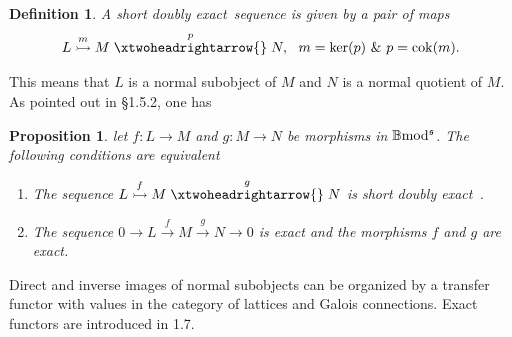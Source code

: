 \documentclass[12pt]{article}
\newtheorem{prop}[thm]{Proposition}
\newtheorem{defn}[thm]{Definition}
\def\sker{{\rm ker}}
\def\scoker{{\rm cok}}
\def\B{{\mathbb B}}
\def\exxx{{doubly exact}~}
\def\b2{{\rm \B mod^{\mathfrak s}}}
\begin{document}
 \begin{defn}\label{defn shortexact}
 	 A short \exxx sequence is given by a pair of maps $$L\stackrel{m}{\rightarrowtail}M\stackrel{p}{\xtwoheadrightarrow{}}N,~~ m= \sker(p)\ \& \  p= \scoker(m).$$
 \end{defn} 
  This means that 
  $L$ is a normal subobject of $M$ and $N$ is a normal quotient of $M$. As pointed out in \cite{gra1} \S 1.5.2, one has
  \begin{prop}\label{shortex} let $f:L\to M$ and $g:M\to N$ be morphisms in $\b2$. The following conditions are equivalent 
 \begin{enumerate}
  \item The sequence
  $L\stackrel{f}{\rightarrowtail}M\stackrel{g}{\xtwoheadrightarrow{}}N$  is  short \exxx\!.
 \item The sequence $0\to L\stackrel{f}{\to}M\stackrel{g}{\to}N\to 0$ is exact and the  morphisms $f$ and $g$ are exact.
\end{enumerate}  	
  \end{prop}

  
  
  
  
      Direct and inverse images of normal subobjects can be organized by a transfer functor  with values in the category of lattices and Galois connections. Exact functors are  introduced in \cite{gra1} 1.7. \vspace{.05in}
  
\end{document}
